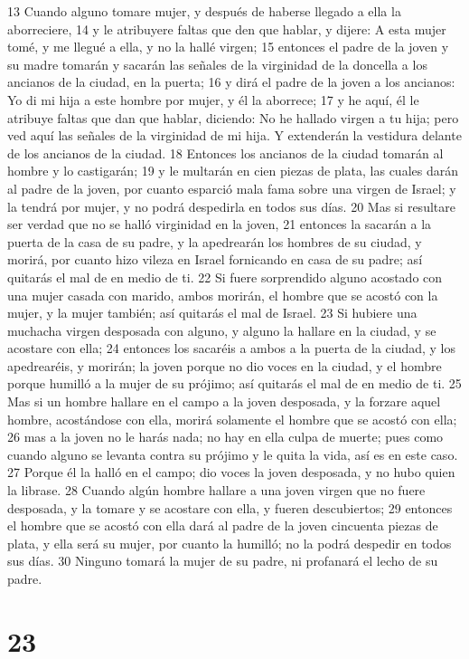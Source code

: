 13 Cuando alguno tomare mujer, y después de haberse llegado a ella la aborreciere,
14 y le atribuyere faltas que den que hablar, y dijere: A esta mujer tomé, y me llegué a ella, y no la hallé virgen;
15 entonces el padre de la joven y su madre tomarán y sacarán las señales de la virginidad de la doncella a los ancianos de la ciudad, en la puerta;
16 y dirá el padre de la joven a los ancianos: Yo di mi hija a este hombre por mujer, y él la aborrece;
17 y he aquí, él le atribuye faltas que dan que hablar, diciendo: No he hallado virgen a tu hija; pero ved aquí las señales de la virginidad de mi hija. Y extenderán la vestidura delante de los ancianos de la ciudad.
18 Entonces los ancianos de la ciudad tomarán al hombre y lo castigarán;
19 y le multarán en cien piezas de plata, las cuales darán al padre de la joven, por cuanto esparció mala fama sobre una virgen de Israel; y la tendrá por mujer, y no podrá despedirla en todos sus días.
20 Mas si resultare ser verdad que no se halló virginidad en la joven,
21 entonces la sacarán a la puerta de la casa de su padre, y la apedrearán los hombres de su ciudad, y morirá, por cuanto hizo vileza en Israel fornicando en casa de su padre; así quitarás el mal de en medio de ti.
22 Si fuere sorprendido alguno acostado con una mujer casada con marido, ambos morirán, el hombre que se acostó con la mujer, y la mujer también; así quitarás el mal de Israel.
23 Si hubiere una muchacha virgen desposada con alguno, y alguno la hallare en la ciudad, y se acostare con ella;
24 entonces los sacaréis a ambos a la puerta de la ciudad, y los apedrearéis, y morirán; la joven porque no dio voces en la ciudad, y el hombre porque humilló a la mujer de su prójimo; así quitarás el mal de en medio de ti.
25 Mas si un hombre hallare en el campo a la joven desposada, y la forzare aquel hombre, acostándose con ella, morirá solamente el hombre que se acostó con ella;
26 mas a la joven no le harás nada; no hay en ella culpa de muerte; pues como cuando alguno se levanta contra su prójimo y le quita la vida, así es en este caso.
27 Porque él la halló en el campo; dio voces la joven desposada, y no hubo quien la librase.
28 Cuando algún hombre hallare a una joven virgen que no fuere desposada, y la tomare y se acostare con ella, y fueren descubiertos;
29 entonces el hombre que se acostó con ella dará al padre de la joven cincuenta piezas de plata, y ella será su mujer, por cuanto la humilló; no la podrá despedir en todos sus días. 
30 Ninguno tomará la mujer de su padre, ni profanará el lecho de su padre.

\chapter{23}

